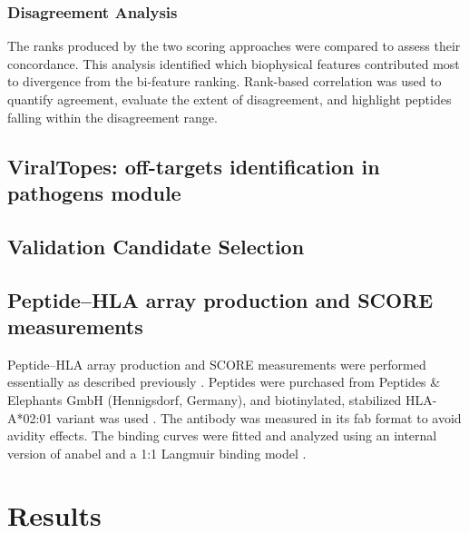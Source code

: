 \documentclass[unnumsec,webpdf,contemporary,large]{oup-authoring-template}%
\theoremstyle{thmstyleone}%
\theoremstyle{thmstyletwo}%
\theoremstyle{thmstylethree}%
\begin{document}
        \subsubsection{Disagreement Analysis}\label{disagreement}
        The ranks produced by the two scoring approaches were compared to assess their concordance. This analysis identified which biophysical features contributed most to divergence from the bi-feature ranking. Rank-based correlation was used to quantify agreement, evaluate the extent of disagreement, and highlight peptides falling within the disagreement range.


        
        
    \subsection{ViralTopes: off-targets identification in pathogens module}\label{viraltopes}
    
    \subsection{Validation Candidate Selection}\label{decisionmatrix}
    
    \subsection{Peptide–HLA array production and SCORE measurements}\label{score}
        Peptide–HLA array production and SCORE measurements were performed essentially as described previously \cite{kramer2023ultra}. Peptides were purchased from Peptides \& Elephants GmbH (Hennigsdorf, Germany), and biotinylated, stabilized HLA-A*02:01 variant was used \cite{saini2019empty}. The antibody was measured in its fab format to avoid avidity effects. The binding curves were fitted and analyzed using an internal version of anabel and a 1:1 Langmuir binding model \cite{kramer2019anabel}.

\section{Results}\label{rslts}
\end{document}
